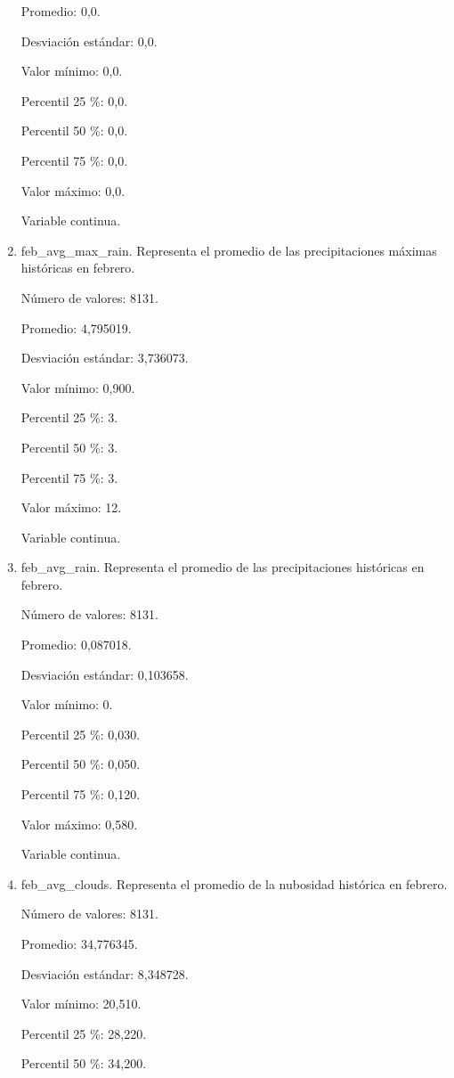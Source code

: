\begin{enumerate}
	Promedio: 0,0.
	
	Desviación estándar: 0,0.
	
	Valor mínimo: 0,0.
	
	Percentil 25 \%: 0,0.
	
	Percentil 50 \%: 0,0.
	
	Percentil 75 \%: 0,0.
	
	Valor máximo: 0,0.
	
	Variable continua.

	\item feb\_avg\_max\_rain. Representa el promedio de las precipitaciones máximas históricas en febrero.
	
	Número de valores: 8131.
	
	Promedio: 4,795019.
	
	Desviación estándar: 3,736073.
	
	Valor mínimo: 0,900.
	
	Percentil 25 \%: 3.
	
	Percentil 50 \%: 3.
	
	Percentil 75 \%: 3.
	
	Valor máximo: 12.
	
	Variable continua.

	\item feb\_avg\_rain. Representa el promedio de las precipitaciones históricas en febrero.
	
	Número de valores: 8131.
	
	Promedio: 0,087018.
	
	Desviación estándar: 0,103658.
	
	Valor mínimo: 0.
	
	Percentil 25 \%: 0,030.
	
	Percentil 50 \%: 0,050.
	
	Percentil 75 \%: 0,120.
	
	Valor máximo: 0,580.
	
	Variable continua.

	\item feb\_avg\_clouds. Representa el promedio de la nubosidad histórica en febrero.
	
	Número de valores: 8131.
	
	Promedio: 34,776345.
	
	Desviación estándar: 8,348728.
	
	Valor mínimo: 20,510.
	
	Percentil 25 \%: 28,220.
	
	Percentil 50 \%: 34,200.
	

\end{enumerate}
